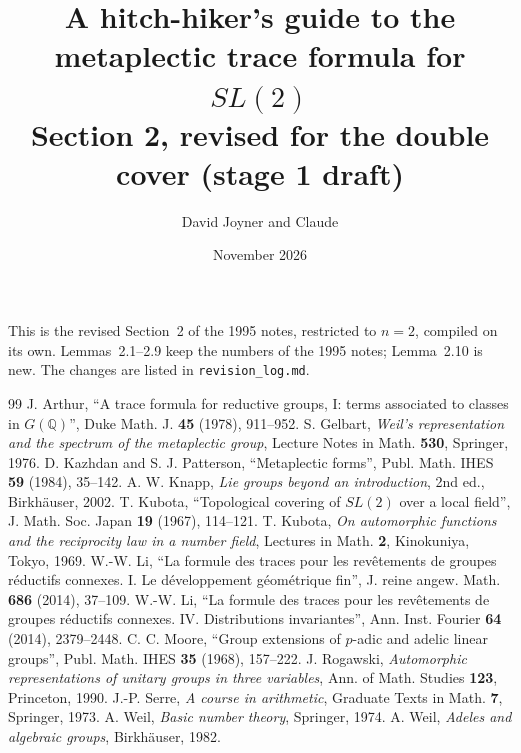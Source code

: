\documentclass[11pt]{article}
\numberwithin{equation}{section}
\theoremstyle{plain}
\theoremstyle{definition}
\theoremstyle{remark}
\begin{document}
\title{A hitch-hiker's guide to the metaplectic trace formula for $SL(2)$\\[2pt]
\large Section 2, revised for the double cover (stage 1 draft)}
\author{David Joyner and Claude}
\date{November 2026}
\maketitle

\noindent This is the revised Section~2 of the 1995 notes, restricted to
$n=2$, compiled on its own. Lemmas~2.1--2.9 keep the numbers of the 1995
notes; Lemma~2.10 is new. The changes are listed in \texttt{revision\_log.md}.

\setcounter{section}{1}


\begin{thebibliography}{99}
 J. Arthur, ``A trace formula for reductive groups, I: terms
associated to classes in $G(\mathbb{Q})$'', Duke Math. J. \textbf{45} (1978), 911--952.
 S. Gelbart, \emph{Weil's representation and the spectrum of
the metaplectic group}, Lecture Notes in Math. \textbf{530}, Springer, 1976.
 D. Kazhdan and S. J. Patterson, ``Metaplectic forms'', Publ.
Math. IHES \textbf{59} (1984), 35--142.
 A. W. Knapp, \emph{Lie groups beyond an introduction}, 2nd ed.,
Birkh\"auser, 2002.
 T. Kubota, ``Topological covering of $SL(2)$ over a local
field'', J. Math. Soc. Japan \textbf{19} (1967), 114--121.
 T. Kubota, \emph{On automorphic functions and the reciprocity
law in a number field}, Lectures in Math. \textbf{2}, Kinokuniya, Tokyo, 1969.
 W.-W. Li, ``La formule des traces pour les rev\^etements
de groupes r\'eductifs connexes. I. Le d\'eveloppement g\'eom\'etrique fin'',
J. reine angew. Math. \textbf{686} (2014), 37--109.
 W.-W. Li, ``La formule des traces pour les rev\^etements
de groupes r\'eductifs connexes. IV. Distributions invariantes'', Ann. Inst.
Fourier \textbf{64} (2014), 2379--2448.
 C. C. Moore, ``Group extensions of $p$-adic and adelic linear
groups'', Publ. Math. IHES \textbf{35} (1968), 157--222.
 J. Rogawski, \emph{Automorphic representations of unitary groups
in three variables}, Ann. of Math. Studies \textbf{123}, Princeton, 1990.
 J.-P. Serre, \emph{A course in arithmetic}, Graduate Texts in
Math. \textbf{7}, Springer, 1973.
 A. Weil, \emph{Basic number theory}, Springer, 1974.
 A. Weil, \emph{Adeles and algebraic groups}, Birkh\"auser, 1982.
\end{thebibliography}
\end{document}

